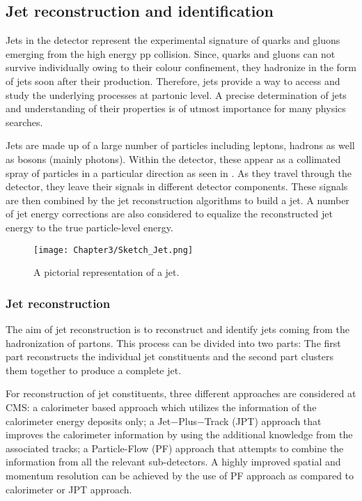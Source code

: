 \subsection{Jet reconstruction and identification}
Jets in the detector represent the experimental signature of quarks and gluons emerging from the high energy pp collision.
Since, quarks and gluons can not survive individually
owing to their colour confinement, they hadronize in the form of jets soon after their production. Therefore, jets provide a way to access and study the
underlying processes at partonic level. A precise determination of jets and understanding of their properties is of utmost importance for many physics searches.

Jets are made up of a large number of particles including leptons, hadrons as well as bosons (mainly photons). Within the detector, these appear as a collimated spray of
particles in a particular direction as seen in \fig{\ref{fig:Jet}}. As they travel through the detector, they leave their signals in different detector components.
These signals are then combined by the jet reconstruction algorithms to build a jet. A number of jet energy corrections are also considered to equalize
the reconstructed jet energy to the true particle-level energy.

\begin{figure}[h]
\begin{center}
\texttt{[image: Chapter3/Sketch\_Jet.png]}
\caption{A pictorial representation of a jet.}
\label{fig:Jet}
\end{center}
\end{figure}
\vspace{-0.2in}

\subsubsection{Jet reconstruction}
The aim of jet reconstruction is to reconstruct and identify jets coming from the hadronization of partons.
This process can be divided into two parts: The first part reconstructs the individual jet constituents and the second part clusters
them together to produce a complete jet. 

For reconstruction of jet constituents, three different approaches are considered at CMS: a calorimeter based approach which utilizes the
information of the calorimeter energy deposits only; a Jet$-$Plus$-$Track (JPT) approach that improves
the calorimeter information by using the additional knowledge from the associated tracks; a Particle-Flow (PF) approach that attempts to combine the information
from all the relevant sub-detectors. A highly improved spatial and momentum resolution can be achieved by the use of PF approach
as compared to calorimeter or JPT approach. 

